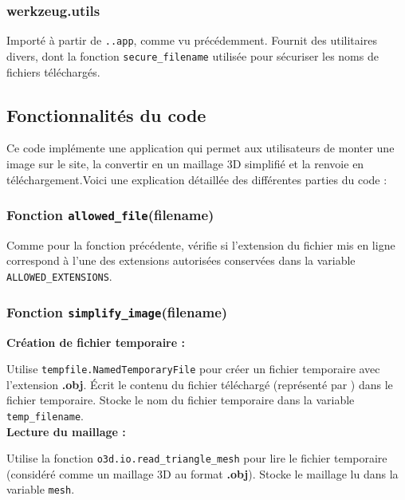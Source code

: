         \subsubsection{werkzeug.utils}

         Importé à partir de \texttt{..app}, comme vu précédemment. Fournit des utilitaires divers, dont la fonction \texttt{secure\_filename} utilisée pour sécuriser les noms de fichiers téléchargés.

        \subsection{Fonctionnalités du code}

        Ce code \py implémente une application  qui permet aux utilisateurs de monter une image sur le site, la convertir en un maillage 3D simplifié et la renvoie en téléchargement.Voici une explication détaillée des différentes parties du code :

        \subsubsection{Fonction \texttt{allowed\_file}(filename)}
        Comme pour la fonction précédente, vérifie si l'extension du fichier mis en ligne correspond à l'une des extensions autorisées conservées dans la variable \texttt{ALLOWED\_EXTENSIONS}.

        \subsubsection{Fonction \texttt{simplify\_image}(filename)}

        \textbf{Création de fichier temporaire :}
        
        Utilise \texttt{tempfile.NamedTemporaryFile} pour créer un fichier temporaire avec l'extension \textbf{.obj}.
        Écrit le contenu du fichier téléchargé (représenté par ) dans le fichier temporaire. 
        Stocke le nom du fichier temporaire dans la variable \texttt{temp\_filename}.\\
        
        \textbf{Lecture du maillage :}
        
        Utilise la fonction \texttt{o3d.io.read\_triangle\_mesh} pour lire le fichier temporaire (considéré comme un maillage 3D au format \textbf{.obj}).
        Stocke le maillage lu dans la variable \texttt{mesh}.\\
        
